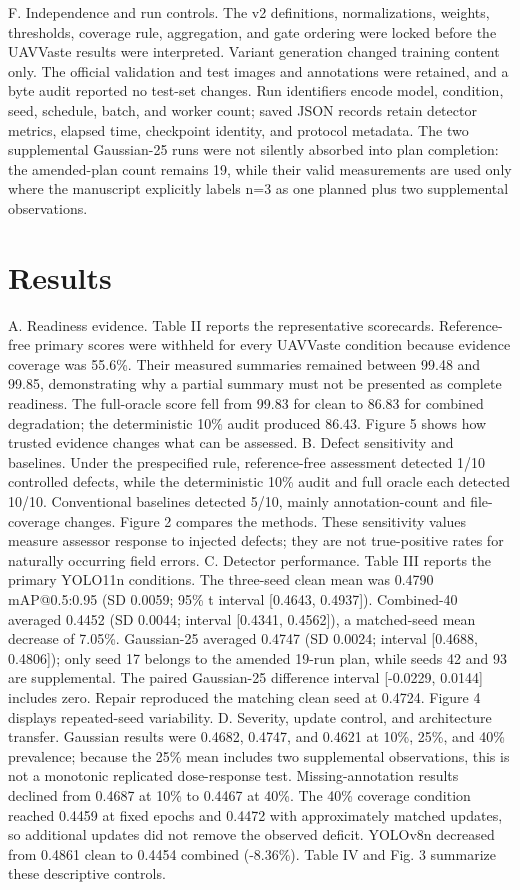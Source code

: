 \documentclass[conference]{IEEEtran}
\begin{document}
F. Independence and run controls. The v2 definitions, normalizations, weights, thresholds, coverage rule, aggregation, and gate ordering were locked before the UAVVaste results were interpreted. Variant generation changed training content only. The official validation and test images and annotations were retained, and a byte audit reported no test-set changes. Run identifiers encode model, condition, seed, schedule, batch, and worker count; saved JSON records retain detector metrics, elapsed time, checkpoint identity, and protocol metadata. The two supplemental Gaussian-25 runs were not silently absorbed into plan completion: the amended-plan count remains 19, while their valid measurements are used only where the manuscript explicitly labels n=3 as one planned plus two supplemental observations.
\section{Results}
A. Readiness evidence. Table II reports the representative scorecards. Reference-free primary scores were withheld for every UAVVaste condition because evidence coverage was 55.6\%. Their measured summaries remained between 99.48 and 99.85, demonstrating why a partial summary must not be presented as complete readiness. The full-oracle score fell from 99.83 for clean to 86.83 for combined degradation; the deterministic 10\% audit produced 86.43. Figure 5 shows how trusted evidence changes what can be assessed.
B. Defect sensitivity and baselines. Under the prespecified rule, reference-free assessment detected 1/10 controlled defects, while the deterministic 10\% audit and full oracle each detected 10/10. Conventional baselines detected 5/10, mainly annotation-count and file-coverage changes. Figure 2 compares the methods. These sensitivity values measure assessor response to injected defects; they are not true-positive rates for naturally occurring field errors.
C. Detector performance. Table III reports the primary YOLO11n conditions. The three-seed clean mean was 0.4790 mAP@0.5:0.95 (SD 0.0059; 95\% t interval [0.4643, 0.4937]). Combined-40 averaged 0.4452 (SD 0.0044; interval [0.4341, 0.4562]), a matched-seed mean decrease of 7.05\%. Gaussian-25 averaged 0.4747 (SD 0.0024; interval [0.4688, 0.4806]); only seed 17 belongs to the amended 19-run plan, while seeds 42 and 93 are supplemental. The paired Gaussian-25 difference interval [-0.0229, 0.0144] includes zero. Repair reproduced the matching clean seed at 0.4724. Figure 4 displays repeated-seed variability.
D. Severity, update control, and architecture transfer. Gaussian results were 0.4682, 0.4747, and 0.4621 at 10\%, 25\%, and 40\% prevalence; because the 25\% mean includes two supplemental observations, this is not a monotonic replicated dose-response test. Missing-annotation results declined from 0.4687 at 10\% to 0.4467 at 40\%. The 40\% coverage condition reached 0.4459 at fixed epochs and 0.4472 with approximately matched updates, so additional updates did not remove the observed deficit. YOLOv8n decreased from 0.4861 clean to 0.4454 combined (-8.36\%). Table IV and Fig. 3 summarize these descriptive controls.
\end{document}
